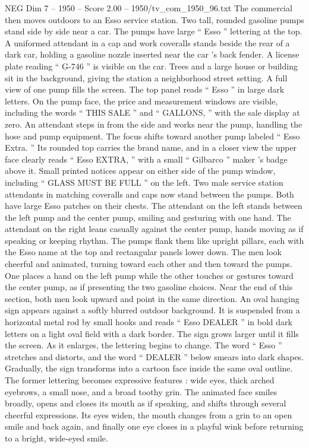 \begin{textsample}{NEG Dim 7 – 1950 – Score 2.00 – 1950/tv\_com\_1950\_96.txt}
The commercial then moves outdoors to an Esso service station.
Two tall, rounded gasoline pumps stand side by side near a car.
The pumps have large “ Esso ” lettering at the top.
A uniformed attendant in a cap and work coveralls stands beside the rear of a dark car, holding a gasoline nozzle inserted near the car ’s back fender.
A license plate reading “ G-746 ” is visible on the car.
Trees and a large house or building sit in the background, giving the station a neighborhood street setting.
A full view of one pump fills the screen.
The top panel reads “ Esso ” in large dark letters.
On the pump face, the price and measurement windows are visible, including the words “ THIS SALE ” and “ GALLONS, ” with the sale display at zero.
An attendant steps in from the side and works near the pump, handling the hose and pump equipment.
The focus shifts toward another pump labeled “ Esso Extra. ” Its rounded top carries the brand name, and in a closer view the upper face clearly reads “ Esso EXTRA, ” with a small “ Gilbarco ” maker ’s badge above it.
Small printed notices appear on either side of the pump window, including “ GLASS MUST BE FULL ” on the left.
Two male service station attendants in matching coveralls and caps now stand between the pumps.
Both have large Esso patches on their chests.
The attendant on the left stands between the left pump and the center pump, smiling and gesturing with one hand.
The attendant on the right leans casually against the center pump, hands moving as if speaking or keeping rhythm.
The pumps flank them like upright pillars, each with the Esso name at the top and rectangular panels lower down.
The men look cheerful and animated, turning toward each other and then toward the pumps.
One places a hand on the left pump while the other touches or gestures toward the center pump, as if presenting the two gasoline choices.
Near the end of this section, both men look upward and point in the same direction.
An oval hanging sign appears against a softly blurred outdoor background.
It is suspended from a horizontal metal rod by small hooks and reads “ Esso DEALER ” in bold dark letters on a light oval field with a dark border.
The sign grows larger until it fills the screen.
As it enlarges, the lettering begins to change.
The word “ Esso ” stretches and distorts, and the word “ DEALER ” below smears into dark shapes.
Gradually, the sign transforms into a cartoon face inside the same oval outline.
The former lettering becomes expressive features : wide eyes, thick arched eyebrows, a small nose, and a broad toothy grin.
The animated face smiles broadly, opens and closes its mouth as if speaking, and shifts through several cheerful expressions.
Its eyes widen, the mouth changes from a grin to an open smile and back again, and finally one eye closes in a playful wink before returning to a bright, wide-eyed smile.

\end{textsample}
